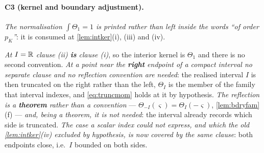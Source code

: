 \paragraph{C3 (kernel and boundary adjustment).}

\emph{The normalisation $\int\Theta_1=1$ is printed rather than left inside the words ``of order
$p_K$''}: it is consumed at \cref{lem:intker}(i), (iii) and (iv).

\medskip
\noindent
\emph{At $I=\mathbb{R}$ clause (ii) \textbf{is} clause (i)}, so the interior kernel is $\Theta_1$ and there is
no second convention. \emph{At a point near the \textbf{right} endpoint of a compact interval no
separate clause and no reflection convention are needed}: the realised interval $I$ is then truncated
on the right rather than the left, $\Theta_I$ is the member of the family that interval indexes, and
\eqref{eq:truncmom} holds at it by hypothesis. \emph{The reflection is a
\textbf{theorem} rather than a convention} --- $\Theta_{-I}(\varsigma)=\Theta_I(-\varsigma)$,
\cref{lem:bdryfam}(f) --- \emph{and, being a theorem, it is not needed}: the interval already records
which side is truncated. \emph{The case a scalar index could not express, and which the old
\cref{lem:intker}(iv) excluded by hypothesis, is now covered by the same clause}: both endpoints close,
i.e.\ $I$ bounded on both sides.


